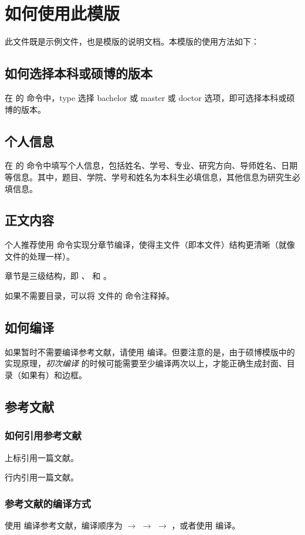 
\section{如何使用此模版}

此文件既是示例文件，也是模版的说明文档。本模版的使用方法如下：

\subsection{如何选择本科或硕博的版本}

在  的  命令中，type 选择 bachelor 或 master 或 doctor 选项，即可选择本科或硕博的版本。


\subsection{个人信息}

在  的  命令中填写个人信息，包括姓名、学号、专业、研究方向、导师姓名、日期等信息。其中，题目、学院、学号和姓名为本科生必填信息，其他信息为研究生必填信息。


\subsection{正文内容}

个人推荐使用  命令实现分章节编译，使得主文件（即本文件）结构更清晰（就像  文件的处理一样）。

章节是三级结构，即 、 和 。

如果不需要目录，可以将  文件的  命令注释掉。


\subsection{如何编译}

如果暂时不需要编译参考文献，请使用  编译。但要注意的是，由于硕博模版中的实现原理，\emph{初次编译} 的时候可能需要至少编译两次以上，才能正确生成封面、目录（如果有）和边框。


\subsection{参考文献}

\subsubsection{如何引用参考文献}

上标引用一篇文献\cite{研究生学位论文开题报告登记表}。

行内引用一篇文献\parencite{研究生学位论文开题报告登记表}。


\subsubsection{参考文献的编译方式}

使用  编译参考文献，编译顺序为  $\to$  $\to$  $\to$ ，或者使用  编译。